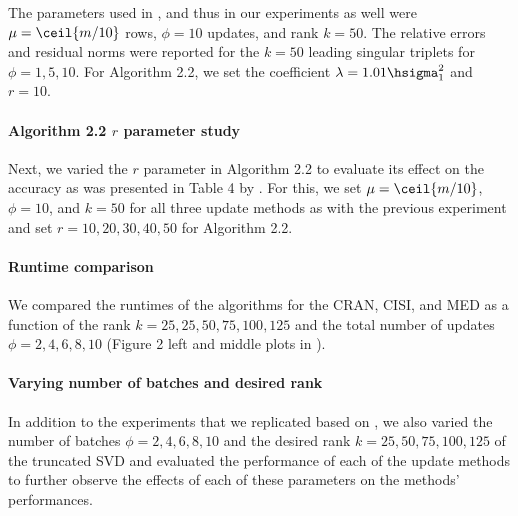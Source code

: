 The parameters used in \cite{Kalantzis2021}, and thus in our experiments as well were $\mu=\ceil{m/10}$ rows, $\phi=10$ updates, and rank $k=50$. The relative errors and residual norms were reported for the $k=50$ leading singular triplets for $\phi=1, 5, 10$. For Algorithm 2.2, we set the coefficient $\lambda=1.01 \hsigma_1^2$ and $r=10$.

\paragraph{Algorithm 2.2 $r$ parameter study}

Next, we varied the $r$ parameter in Algorithm 2.2 to evaluate its effect on the accuracy as was presented in Table 4 by \cite{Kalantzis2021}. For this, we set $\mu=\ceil{m/10}$, $\phi=10$, and $k=50$ for all three update methods as with the previous experiment and set $r=10,20,30,40,50$ for Algorithm 2.2.

\paragraph{Runtime comparison} 

We compared the runtimes of the algorithms for the CRAN, CISI, and MED as a function of the rank $k=25,25,50,75,100,125$ and the total number of updates $\phi=2,4,6,8,10$ (Figure 2 left and middle plots in \cite{Kalantzis2021}).

%
%
%
\paragraph{Varying number of batches and desired rank}

In addition to the experiments that we replicated based on \cite{Kalantzis2021}, we also varied the number of batches $\phi=2,4,6,8,10$ and the desired rank $k=25,50,75,100,125$ of the truncated SVD and evaluated the performance of each of the update methods to further observe the effects of each of these parameters on the methods' performances.
